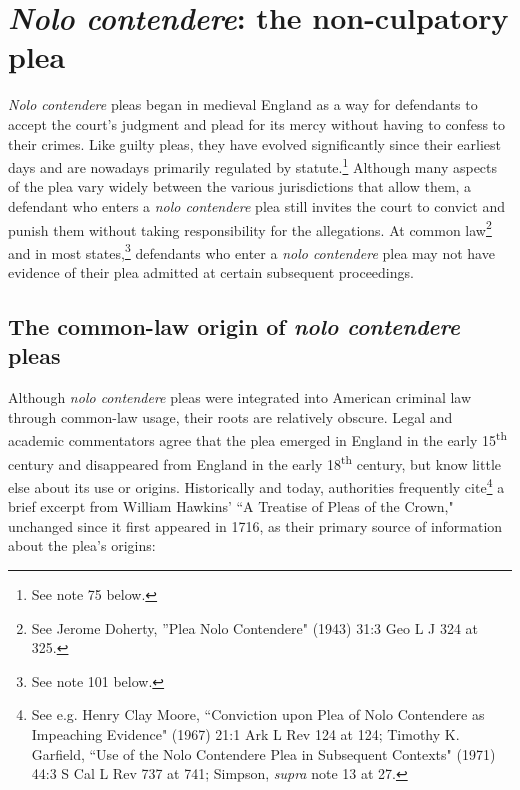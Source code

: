 \section{\textit{Nolo contendere}: the non-culpatory plea}

\textit{Nolo contendere} pleas began in medieval England as a way for defendants to accept the court's judgment and plead for its mercy without having to confess to their crimes. Like guilty pleas, they have evolved significantly since their earliest days and are nowadays primarily regulated by statute.\footnote{See note 75 below.} Although many aspects of the plea vary widely between the various jurisdictions that allow them, a defendant who enters a \textit{nolo contendere} plea still invites the court to convict and punish them without taking responsibility for the allegations. At common law\footnote{See Jerome Doherty, ''Plea Nolo Contendere" (1943) 31:3 Geo L J 324 at 325.} and in most states,\footnote{See note 101 below.} defendants who enter a \textit{nolo contendere} plea may not have evidence of their plea admitted at certain subsequent proceedings. 

\subsection{The common-law origin of \textit{nolo contendere} pleas}

Although \textit{nolo contendere} pleas were integrated into American criminal law through common-law usage, their roots are relatively obscure. Legal and academic commentators agree that the plea emerged in England in the early 15\textsuperscript{th} century and disappeared from England in the early 18\textsuperscript{th} century, but know little else about its use or origins. Historically and today, authorities frequently cite\footnote{See e.g. Henry Clay Moore, ``Conviction upon Plea of Nolo Contendere as Impeaching Evidence" (1967) 21:1 Ark L Rev 124 at 124; Timothy K. Garfield, ``Use of the Nolo Contendere Plea in Subsequent Contexts" (1971) 44:3 S Cal L Rev 737 at 741; Simpson, \textit{supra} note 13 at 27.} a brief excerpt from William Hawkins' ``A Treatise of Pleas of the Crown," unchanged since it first appeared in 1716, as their primary source of information about the plea's origins:


